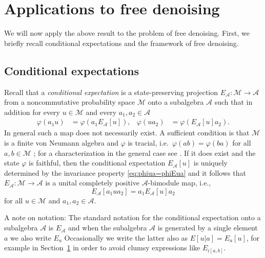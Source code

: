 \documentclass[12pt]{amsart}
\def\E{E}
\newcommand{\alg}[1]{\mathcal{#1}}
\theoremstyle{definition}
\numberwithin{equation}{section}
\begin{document}
\section{Applications to free denoising}
\label{sec:denoising}
We will now apply the above result to the problem of free denoising. First, we
briefly recall conditional expectations and the framework of free denoising. 

\subsection{Conditional expectations}
Recall that a \emph{conditional expectation}
is a state-preserving projection $\E_{\alg{A}}:\alg{M}\to \alg{A}$
from a noncommutative probability space $\alg{M}$ onto a subalgebra $\alg{A}$
such that in addition
for every $u\in\alg{M}$ and
every $a_1,a_2\in\alg{A}$
\begin{align}
  \label{eq:phiua=phiEua}
  \varphi(a_1u)&=\varphi(a_1\E_{\alg{A}}[u]),
  &
    \varphi(ua_2)
  &=\varphi(\E_{\alg{A}}[u]a_2)
    .
\end{align}
In general such a map does not necessarily exist.
A sufficient condition is that $\alg{M}$ is a finite
von Neumann algebra and $\varphi$ is tracial,
i.e.~$\varphi(ab) =\varphi(ba)$ for all $a,b\in \alg{M}$
\cite[Proposition~5.2.36]{Takesaki1};
for a characterization in the general case see \cite {Takesaki:1972}.
If it does exist and the state $\varphi$ is faithful, then the conditional expectation
$\E_{\alg{A}}[u]$ is uniquely determined by the invariance property \eqref{eq:phiua=phiEua}
and it follows that
$\E_{\alg{A}}:\alg{M}\to\alg{A}$ is a unital completely positive $\alg{A}$-bimodule map, i.e.,
\begin{equation}
  \label{eq:modularproperty}
  \E_{\alg{A}}[a_1ua_2]=a_1\E_{\alg{A}}[u]a_2 
\end{equation}
for all $u\in\alg{M}$ and $a_1,a_2\in\alg{A}$. 



A note on notation:
The standard notation for the conditional expectation onto a subalgebra
$\alg{A}$ is $\E_{\alg{A}}$ and when the subalgebra  $\alg{A}$ is generated
by a single element $a$ we also write $\E_{a}$ 
Occasionally we write the latter also as $E[u|a]=E_a[u]$,
for example in Section~\ref{sec:denoising} in order to avoid clumsy expressions like
$\E_{i[a,b]}$.
\end{document}
